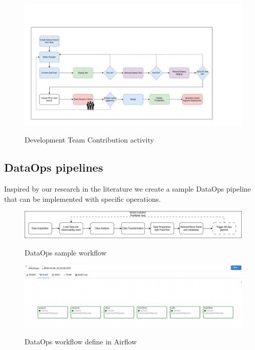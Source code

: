 \begin{figure}[!htbp]
    \centering
    \caption{Development Team Contribution activity}
    \includegraphics[scale=0.3]{images/project/cicd-workflow-p2}
    \label{fig:cd-workflow-p2}
\end{figure}


\subsection{DataOps pipelines}\label{subsec:dataops-pipelines}
Inspired by our research in the literature we create a sample DataOps pipeline that can be implemented with specific
operations.

\begin{figure}[!htbp]
    \centering
    \caption{DataOps sample workflow}
    \includegraphics[scale=0.3]{images/project/dataops-workflow}
    \label{fig:project-dataops-workflow}
\end{figure}

\begin{figure}[!htbp]
    \centering
    \caption{DataOps workflow define in Airflow}
    \includegraphics[scale=0.3]{images/project/dataops-workflow-airflow}
    \label{fig:dataops-workflow-airflow}
\end{figure}

